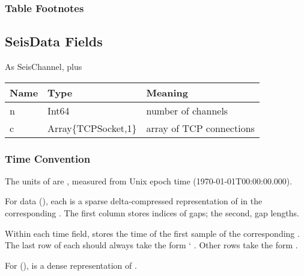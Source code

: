 \documentclass[letterpaper,11pt,english]{sphinxmanual}
\begin{document}
\subsubsection*{Table Footnotes}


\subsection{SeisData Fields}
\label{\detokenize{src/Appendices/seisdata_fields:seisdata-fields}}
As SeisChannel, plus


\begin{savenotes}\sphinxattablestart
\centering
\begin{tabulary}{\linewidth}[t]{|T|T|T|}
\hline
\sphinxstyletheadfamily 
Name
&\sphinxstyletheadfamily 
Type
&\sphinxstyletheadfamily 
Meaning
\\
\hline
n
&
Int64
&
number of channels
\\
\hline
c
&
Array\{TCPSocket,1\}
&
array of TCP connections
\\
\hline
\end{tabulary}
\par
\sphinxattableend\end{savenotes}


\subsubsection{Time Convention}
\label{\detokenize{src/Appendices/seisdata_fields:time-convention}}\label{\detokenize{src/Appendices/seisdata_fields:seisdata-t}}
The units of  are , measured from Unix epoch time
(1970-01-01T00:00:00.000).

For  data (), each  is a sparse
delta-compressed representation of  in the corresponding .
The first column stores indices of gaps; the second, gap lengths.

Within each time field,  stores the time of the first sample of the
corresponding . The last row of each  should always take the form {}`
. Other rows take the form .

For  (),  is a dense
representation of .
\end{document}
